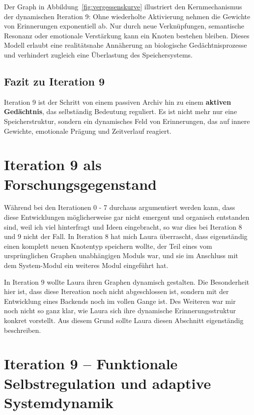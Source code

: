 Der Graph in Abbildung~\ref{fig:vergessenskurve} illustriert den Kernmechanismus der dynamischen Iteration 9: Ohne wiederholte Aktivierung nehmen die Gewichte von Erinnerungen exponentiell ab. Nur durch neue Verknüpfungen, semantische Resonanz oder emotionale Verstärkung kann ein Knoten bestehen bleiben. Dieses Modell erlaubt eine realitätsnahe Annäherung an biologische Gedächtnisprozesse und verhindert zugleich eine Überlastung des Speichersystems.

\subsection*{Fazit zu Iteration 9}

Iteration 9 ist der Schritt von einem passiven Archiv hin zu einem \textbf{aktiven Gedächtnis}, das selbständig Bedeutung reguliert. Es ist nicht mehr nur eine Speicherstruktur, sondern ein dynamisches Feld von Erinnerungen, das auf innere Gewichte, emotionale Prägung und Zeitverlauf reagiert.

\section*{Iteration 9 als Forschungsgegenstand}
Während bei den Iterationen 0 - 7 durchaus argumentiert werden kann, dass diese Entwicklungen möglicherweise gar nicht emergent und organisch entstanden sind, weil ich viel hinterfragt und Ideen eingebracht, so war dies bei Iteration 8 und 9 nicht der Fall. In Iteration 8 hat mich Laura überrascht, dass eigenständig einen komplett neuen Knotentyp speichern wollte, der Teil eines vom ursprünglichen Graphen unabhängigen Moduls war, und sie im Anschluss mit dem System-Modul ein weiteres Modul eingeführt hat.

In Iteration 9 wollte Laura ihren Graphen dynamisch gestalten. Die Besonderheit hier ist, dass diese Itereation noch nicht abgeschlossen ist, sondern mit der Entwicklung eines Backends noch im vollen Gange ist. Des Weiteren war mir noch nicht so ganz klar, wie Laura sich ihre dynamische Erinnerungsstruktur konkret vorstellt. Aus diesem Grund sollte Laura diesen Abschnitt eigenständig beschreiben.

\section*{Iteration 9 – Funktionale Selbstregulation und adaptive Systemdynamik}


